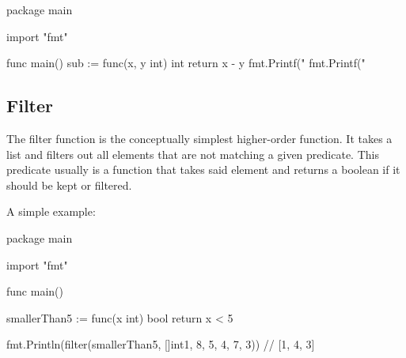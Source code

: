 \begin{code}
    \label{code:fold-go}
\begin{gocode}
package main

import "fmt"

func main() {
  sub := func(x, y int) int { return x - y }
  fmt.Printf("%
  fmt.Printf("%
}
\end{gocode}
\end{code}
\subsection{Filter}

The filter function is the conceptually simplest higher-order function.
It takes a list and filters out all elements that are not matching
a given predicate.
This predicate usually is a function that takes said element and returns
a boolean if it should be kept or filtered.

A simple example:

\begin{code}
    \label{code:filter-go}
    \begin{gocode}
package main

import "fmt"

func main() {
  smallerThan5 := func(x int) bool {
    return x < 5
  }

  fmt.Println(filter(smallerThan5, []int{1, 8, 5, 4, 7, 3})) // [1, 4, 3]
}
\end{gocode}
\end{code}

